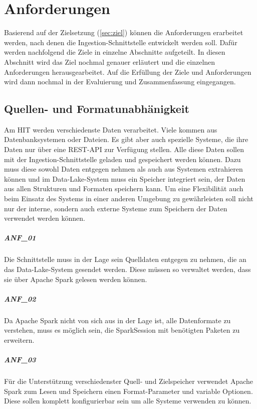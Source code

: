 \chapter{Anforderungen}
\label{sec:anf}

Basierend auf der Zielsetzung (\cref{sec:ziel}) können die Anforderungen erarbeitet werden, nach denen die Ingestion-Schnittstelle entwickelt werden soll.
Dafür werden nachfolgend die Ziele in einzelne Abschnitte aufgeteilt.
In diesen Abschnitt wird das Ziel nochmal genauer erläutert und die einzelnen Anforderungen herausgearbeitet.
Auf die Erfüllung der Ziele und Anforderungen wird dann nochmal in der Evaluierung und Zusammenfassung eingegangen.

\section{Quellen- und Formatunabhänigkeit}
\label{sec:anf-unab}
Am HIT werden verschiedenste Daten verarbeitet.
Viele kommen aus Datenbanksystemen oder Dateien.
Es gibt aber auch spezielle Systeme, die ihre Daten nur über eine REST-API zur Verfügung stellen.
Alle diese Daten sollen mit der Ingestion-Schnittstelle geladen und gespeichert werden können.
Dazu muss diese sowohl Daten entgegen nehmen als auch aus Systemen extrahieren können und im Data-Lake-System muss ein Speicher integriert sein, der Daten aus allen Strukturen und Formaten speichern kann.
Um eine Flexibilität auch beim Einsatz des Systems in einer anderen Umgebung zu gewährleisten soll nicht nur der interne, sondern auch externe Systeme zum Speichern der Daten verwendet werden können.

\paragraph{ANF\_01}
\label{ANF_01}
Die Schnittstelle muss in der Lage sein Quelldaten entgegen zu nehmen, die an das Data-Lake-System gesendet werden.
Diese müssen so verwaltet werden, dass sie über Apache Spark gelesen werden können.

\paragraph{ANF\_02}
\label{ANF_02}
Da Apache Spark nicht von sich aus in der Lage ist, alle Datenformate zu verstehen, muss es möglich sein, die SparkSession mit benötigten Paketen zu erweitern.

\paragraph{ANF\_03}
\label{ANF_03}
Für die Unterstützung verschiedenster Quell- und Zielspeicher verwendet Apache Spark zum Lesen und Speichern einen Format-Parameter und variable Optionen.
Diese sollen komplett konfigurierbar sein um alle Systeme verwenden zu können.

